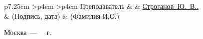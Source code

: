 \begin{titlepage}
\begin{table}[h!]
		\begin{signstabular}[0.7]{p{7.25cm} >{\centering\arraybackslash}p{4cm} >{\centering\arraybackslash}p{4cm}}
			Преподаватель & \uline{\mbox{\hspace*{4cm}}} & \uline{\hfill Строганов~Ю.~В.. \hfill} \\
			& \scriptsize (Подпись, дата) & \scriptsize (Фамилия И.О.)
		\end{signstabular}
	\end{table}
	
	\begin{center}
		\vfill
		Москва~---~\the\year
		~г.
	\end{center}
	\restoregeometry
\end{titlepage}
